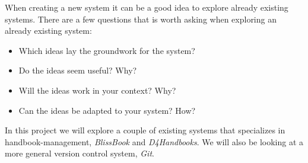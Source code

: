 When creating a new system it can be a good idea to explore already existing systems. There are a few questions that is worth asking when exploring an already existing system:

\begin{itemize}
  \item Which ideas lay the groundwork for the system?
  \item Do the ideas seem useful? Why?
  \item Will the ideas work in your context? Why?
  \item Can the ideas be adapted to your system? How?
\end{itemize}


In this project we will explore a couple of existing systems that specializes in handbook-management, \textit{BlissBook} and \textit{D4Handbooks}. We will also be looking at a more general version control system, \textit{Git}.
